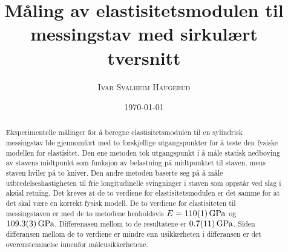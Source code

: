 \documentclass[%
 reprint,
 amsmath,amssymb,
 aps,
 norsk,
 booktabs
]{revtex4-1}
\begin{document}
\title{Måling av elastisitetsmodulen til messingstav med sirkulært tversnitt}
\author{\textsc{Ivar Svalheim Haugerud}}
\date{\today}

\begin{abstract}
  Eksperimentelle målinger for å beregne elastisitetsmodulen til en sylindrisk messingstav ble gjennomført med to forskjellige utgangspunkter for å teste den fysiske modellen for elastisitet. Den ene metoden tok utgangspunkt i å måle statisk nedbøying av stavens midtpunkt som funksjon av belastning på midtpunktet til staven, mens staven hviler på to kniver. Den andre metoden baserte seg på å måle utbredelseshastigheten til frie longitudinelle svingninger i staven som oppstår ved slag i aksial retning. Det kreves at de to verdiene for elastisitetsmodulen er det samme for at det skal være en korrekt fysisk modell. De to verdiene for elastisiteten til messingstaven er med de to metodene henholdsvis
  $E=\SI{110\pm1}{\giga\pascal}$ og $\SI{109.3\pm0.3}{\giga\pascal}$. Differenasen mellom to de resultatene er $\SI{0.7\pm1.1}{\giga\pascal}$. Siden differansen mellom de to verdiene er mindre enn usikkerheten i differansen er det overenstemmelse innenfor måleusikkerhetene.
\end{abstract}

\maketitle

\end{document}
